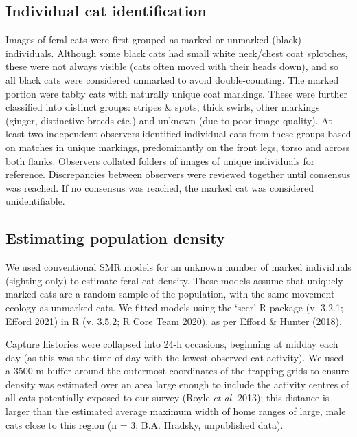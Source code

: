 \documentclass[11pt,a4paper,titlepage,twoside,openright]{style/unimelbthesis}
\begin{document}
\begin{mainmatter}
\hypertarget{individual-cat-identification}{%
\subsection{Individual cat identification}\label{individual-cat-identification}}

Images of feral cats were first grouped as marked or unmarked (black) individuals. Although some black cats had small white neck/chest coat splotches, these were not always visible (cats often moved with their heads down), and so all black cats were considered unmarked to avoid double-counting. The marked portion were tabby cats with naturally unique coat markings. These were further classified into distinct groups: stripes \& spots, thick swirls, other markings (ginger, distinctive breeds etc.) and unknown (due to poor image quality). At least two independent observers identified individual cats from these groups based on matches in unique markings, predominantly on the front legs, torso and across both flanks. Observers collated folders of images of unique individuals for reference. Discrepancies between observers were reviewed together until consensus was reached. If no consensus was reached, the marked cat was considered unidentifiable.

\hypertarget{estimating-population-density}{%
\subsection{Estimating population density}\label{estimating-population-density}}

We used conventional SMR models for an unknown number of marked individuals (sighting-only) to estimate feral cat density. These models assume that uniquely marked cats are a random sample of the population, with the same movement ecology as unmarked cats. We fitted models using the `secr' R-package (v. 3.2.1; Efford 2021) in R (v. 3.5.2; R Core Team 2020), as per Efford \& Hunter (2018).

Capture histories were collapsed into 24-h occasions, beginning at midday each day (as this was the time of day with the lowest observed cat activity). We used a 3500 m buffer around the outermost coordinates of the trapping grids to ensure density was estimated over an area large enough to include the activity centres of all cats potentially exposed to our survey (Royle \emph{et al.} 2013); this distance is larger than the estimated average maximum width of home ranges of large, male cats close to this region (n = 3; B.A. Hradsky, unpublished data).


\end{mainmatter}
\end{document}
